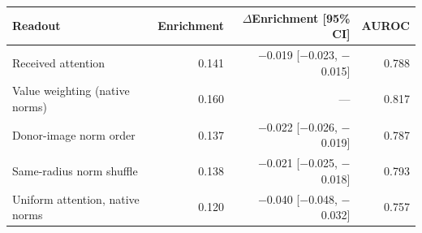 \begin{tabular}{@{}lrrr@{}}
\toprule
Readout & Enrichment & $\Delta$Enrichment [95\% CI] & AUROC \\
\midrule
Received attention & 0.141 & $-$0.019 [$-$0.023, $-$0.015] & 0.788 \\
Value weighting (native norms) & 0.160 & --- & 0.817 \\
Donor-image norm order & 0.137 & $-$0.022 [$-$0.026, $-$0.019] & 0.787 \\
Same-radius norm shuffle & 0.138 & $-$0.021 [$-$0.025, $-$0.018] & 0.793 \\
Uniform attention, native norms & 0.120 & $-$0.040 [$-$0.048, $-$0.032] & 0.757 \\
\bottomrule
\end{tabular}
